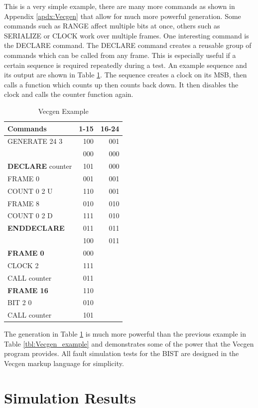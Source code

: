 \documentclass[12pt]{report}
\begin{document}
This is a very simple example, there are many more commands as shown in Appendix \ref{apdx:Vecgen} that allow for much more powerful generation.  Some commands such as RANGE affect multiple bits at once, others such as SERIALIZE or CLOCK work over multiple frames.  One interesting command is the DECLARE command.  The DECLARE command creates a reusable group of commands which can be called from any frame.  This is especially useful if a certain sequence is required repeatedly during a test.  An example sequence and its output are shown in Table \ref{tbl:countsequence}.  The sequence creates a clock on its MSB, then calls a function which counts up then counts back down.  It then disables the clock and calls the counter function again.
\begin{table}
	\caption{Vecgen Example}
	\begin{center}
		\begin{tabular}{l|r|r}
		Commands & 1-15 & 16-24 \\ \hline
		GENERATE 24 3 & 100 & 001 \\
		 & 000 & 000 \\
		\textbf{DECLARE} counter & 101 & 000 \\
		FRAME 0	& 001 & 001 \\
		COUNT 0 2 U & 110 & 001 \\
		FRAME 8 & 010 & 010 \\
		COUNT 0 2 D & 111 & 010 \\
		\textbf{ENDDECLARE} & 011 & 011 \\ 
		 & 100 & 011 \\
 		\textbf{FRAME 0} & 000 & \\
		CLOCK 2 & 111 &  \\
		CALL counter & 011 & \\
		\textbf{FRAME 16} & 110 & \\
		BIT 2 0 & 010 &  \\
		CALL counter & 101 & \\
		\end{tabular}
	\end{center}
	\label{tbl:countsequence}
\end{table}
The generation in Table \ref{tbl:countsequence} is much more powerful than the previous example in Table \ref{tbl:Vecgen_example} and demonstrates some of the power that the Vecgen program provides.  All fault simulation tests for the BIST are designed in the Vecgen markup language for simplicity.

\chapter{Simulation Results}
\end{document}
